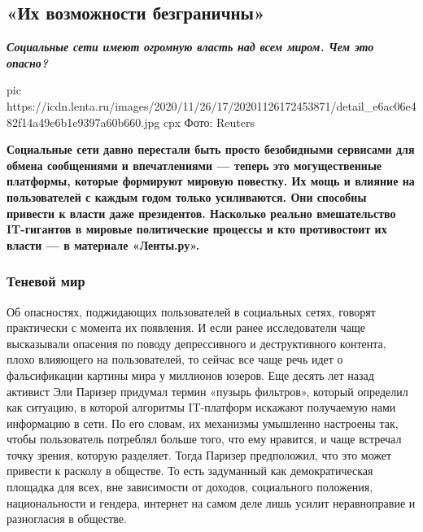  
 
 
 
 
 
\subsection{«Их возможности безграничны»}
\label{sec:27_11_2020.news.ru.lenta_ru.1.soc_seti}


\begin{center}
	\begingroup
		\bfseries\em\Large\color{orange}
		Социальные сети имеют огромную власть над всем миром. Чем это опасно?
	\endgroup
\end{center}

\ifcmt
pic https://icdn.lenta.ru/images/2020/11/26/17/20201126172453871/detail_e6ac06e482f14a49e6b1e9397a60b660.jpg
cpx Фото: Reuters
\fi

\begin{leftbar}
	\bfseries\color{blue}\large
Социальные сети давно перестали быть просто безобидными сервисами для обмена
сообщениями и впечатлениями — теперь это могущественные платформы,
которые формируют мировую повестку. Их мощь и влияние на пользователей
с каждым годом только усиливаются. Они способны привести к власти даже
президентов. Насколько реально вмешательство IT-гигантов в мировые
политические процессы и кто противостоит их власти — в материале
«Ленты.ру».
\end{leftbar}

\subsubsection{Теневой мир}

Об опасностях, поджидающих пользователей в социальных сетях, говорят
практически с момента их появления. И если ранее исследователи чаще высказывали
опасения по поводу депрессивного и деструктивного контента, плохо влияющего на
пользователей, то сейчас все чаще речь идет о фальсификации картины мира у
миллионов юзеров. Еще десять лет назад активист Эли Паризер придумал термин
«пузырь фильтров», который определил как ситуацию, в которой алгоритмы
IT-платформ искажают получаемую нами информацию в сети. По его словам, их
механизмы умышленно настроены так, чтобы пользователь потреблял больше того,
что ему нравится, и чаще встречал точку зрения, которую разделяет. Тогда
Паризер предположил, что это может привести к расколу в обществе. То есть
задуманный как демократическая площадка для всех, вне зависимости от доходов,
социального положения, национальности и гендера, интернет на самом деле лишь
усилит неравноправие и разногласия в обществе.

